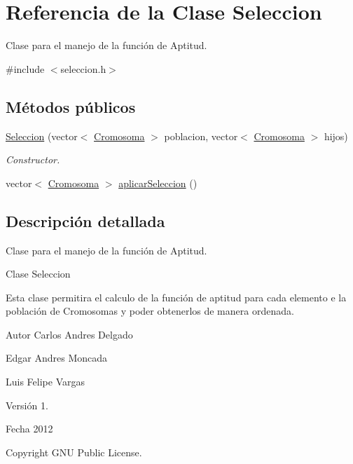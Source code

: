 \hypertarget{classSeleccion}{\section{Referencia de la Clase Seleccion}
\label{classSeleccion}
}


Clase para el manejo de la función de Aptitud.  




{\ttfamily \#include $<$seleccion.\-h$>$}

\subsection*{Métodos públicos}
\begin{DoxyCompactItemize}
\item 
\hyperlink{classSeleccion_a98fa8d406a3f543405dab4f25efde0a0}{Seleccion} (vector$<$ \hyperlink{classCromosoma}{Cromosoma} $>$ poblacion, vector$<$ \hyperlink{classCromosoma}{Cromosoma} $>$ hijos)
\begin{DoxyCompactList}\small\item\em Constructor. \end{DoxyCompactList}\item 
vector$<$ \hyperlink{classCromosoma}{Cromosoma} $>$ \hyperlink{classSeleccion_ae8ac58d7995c5807522fa3eba7a17ebb}{aplicar\-Seleccion} ()
\end{DoxyCompactItemize}


\subsection{Descripción detallada}
Clase para el manejo de la función de Aptitud. 

\begin{DoxyVerb}Clase Seleccion
\end{DoxyVerb}


Esta clase permitira el calculo de la función de aptitud para cada elemento e la población de Cromosomas y poder obtenerlos de manera ordenada. \begin{DoxyAuthor}{Autor}
Carlos Andres Delgado 

Edgar Andres Moncada 

Luis Felipe Vargas 
\end{DoxyAuthor}
\begin{DoxyVersion}{Versión}
1. 
\end{DoxyVersion}
\begin{DoxyDate}{Fecha}
2012 
\end{DoxyDate}
\begin{DoxyCopyright}{Copyright}
G\-N\-U Public License. 
\end{DoxyCopyright}


